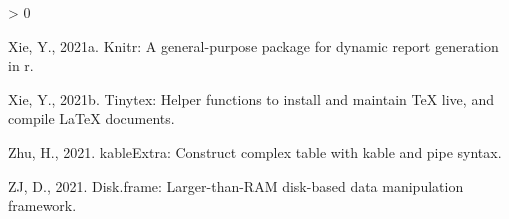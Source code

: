 \documentclass[]{elsarticle} %
\newlength{\cslhangindent}
\newenvironment{CSLReferences}[2] %
 {%
  \setlength{\parindent}{0pt}
  \ifodd #1 \everypar{\setlength{\hangindent}{\cslhangindent}}\ignorespaces\fi
  \ifnum #2 > 0
  \setlength{\parskip}{#2\baselineskip}
  \fi
 }%
 {}
\begin{document}
\begin{CSLReferences}{1}{0}
\leavevmode\hypertarget{ref-R-knitr}{}%
Xie, Y., 2021a. Knitr: A general-purpose package for dynamic report
generation in r.

\leavevmode\hypertarget{ref-R-tinytex}{}%
Xie, Y., 2021b. Tinytex: Helper functions to install and maintain TeX
live, and compile LaTeX documents.

\leavevmode\hypertarget{ref-R-kableExtra}{}%
Zhu, H., 2021. kableExtra: Construct complex table with kable and pipe
syntax.

\leavevmode\hypertarget{ref-R-disk.frame}{}%
ZJ, D., 2021. Disk.frame: Larger-than-RAM disk-based data manipulation
framework.

\end{CSLReferences}
\end{document}
